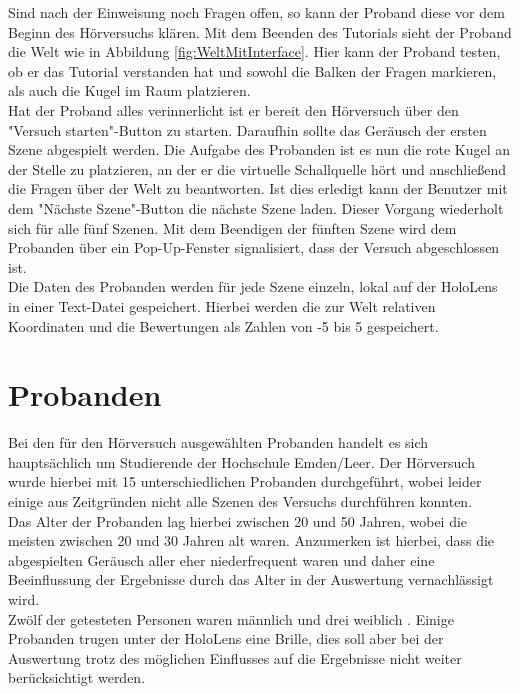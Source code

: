 Sind nach der Einweisung noch Fragen offen, so kann der Proband diese vor dem Beginn des Hörversuchs klären. Mit dem Beenden des Tutorials sieht der Proband die Welt wie in Abbildung \ref{fig:WeltMitInterface}. Hier kann der Proband testen, ob er das Tutorial verstanden hat und sowohl die Balken der Fragen markieren, als auch die Kugel im Raum platzieren.  \\
 
 Hat der Proband alles verinnerlicht ist er bereit den Hörversuch über den "Versuch starten"-Button zu starten. Daraufhin sollte das Geräusch der ersten Szene abgespielt werden. Die Aufgabe des Probanden ist es nun die rote Kugel an der Stelle zu platzieren, an der er die virtuelle Schallquelle hört und anschließend die Fragen über der Welt zu beantworten. Ist dies erledigt kann der Benutzer mit dem "Nächste Szene"-Button die nächste Szene laden. Dieser Vorgang wiederholt sich für alle fünf Szenen. Mit dem Beendigen der fünften Szene wird dem Probanden über ein Pop-Up-Fenster signalisiert, dass der Versuch abgeschlossen ist. \\
 
 Die Daten des Probanden werden für jede Szene  einzeln, lokal auf der HoloLens in einer Text-Datei gespeichert. Hierbei werden die zur Welt relativen Koordinaten und die Bewertungen als Zahlen von -5 bis 5 gespeichert. 
 
 
 \section{Probanden}
 
 Bei den für den Hörversuch ausgewählten Probanden handelt es sich hauptsächlich um Studierende der Hochschule Emden/Leer. Der Hörversuch wurde hierbei mit 15 unterschiedlichen Probanden durchgeführt, wobei leider einige aus Zeitgründen nicht alle Szenen des Versuchs durchführen konnten. \\
 
  Das Alter der Probanden lag hierbei zwischen 20 und 50 Jahren, wobei die meisten zwischen 20 und 30 Jahren alt waren. Anzumerken ist hierbei, dass die abgespielten Geräusch aller eher niederfrequent waren und daher eine Beeinflussung der Ergebnisse durch das Alter in der Auswertung vernachlässigt wird. \\ 
  
 Zwölf der getesteten Personen waren männlich und drei  weiblich . Einige Probanden trugen unter der HoloLens eine Brille, dies soll aber bei der Auswertung trotz des möglichen Einflusses auf die Ergebnisse nicht weiter berücksichtigt werden. \\ 
 
